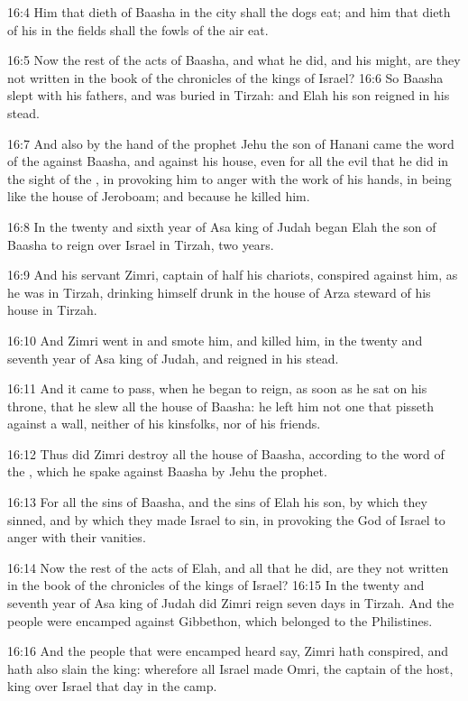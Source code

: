 16:4 Him that dieth of Baasha in the city shall the dogs eat; and him that dieth of his in the fields shall the fowls of the air eat.

16:5 Now the rest of the acts of Baasha, and what he did, and his might, are they not written in the book of the chronicles of the kings of Israel?  16:6 So Baasha slept with his fathers, and was buried in Tirzah: and Elah his son reigned in his stead.

16:7 And also by the hand of the prophet Jehu the son of Hanani came the word of the \LORD against Baasha, and against his house, even for all the evil that he did in the sight of the \LORD, in provoking him to anger with the work of his hands, in being like the house of Jeroboam; and because he killed him.

16:8 In the twenty and sixth year of Asa king of Judah began Elah the son of Baasha to reign over Israel in Tirzah, two years.

16:9 And his servant Zimri, captain of half his chariots, conspired against him, as he was in Tirzah, drinking himself drunk in the house of Arza steward of his house in Tirzah.

16:10 And Zimri went in and smote him, and killed him, in the twenty and seventh year of Asa king of Judah, and reigned in his stead.

16:11 And it came to pass, when he began to reign, as soon as he sat on his throne, that he slew all the house of Baasha: he left him not one that pisseth against a wall, neither of his kinsfolks, nor of his friends.

16:12 Thus did Zimri destroy all the house of Baasha, according to the word of the \LORD, which he spake against Baasha by Jehu the prophet.

16:13 For all the sins of Baasha, and the sins of Elah his son, by which they sinned, and by which they made Israel to sin, in provoking the \LORD God of Israel to anger with their vanities.

16:14 Now the rest of the acts of Elah, and all that he did, are they not written in the book of the chronicles of the kings of Israel?  16:15 In the twenty and seventh year of Asa king of Judah did Zimri reign seven days in Tirzah. And the people were encamped against Gibbethon, which belonged to the Philistines.

16:16 And the people that were encamped heard say, Zimri hath conspired, and hath also slain the king: wherefore all Israel made Omri, the captain of the host, king over Israel that day in the camp.


